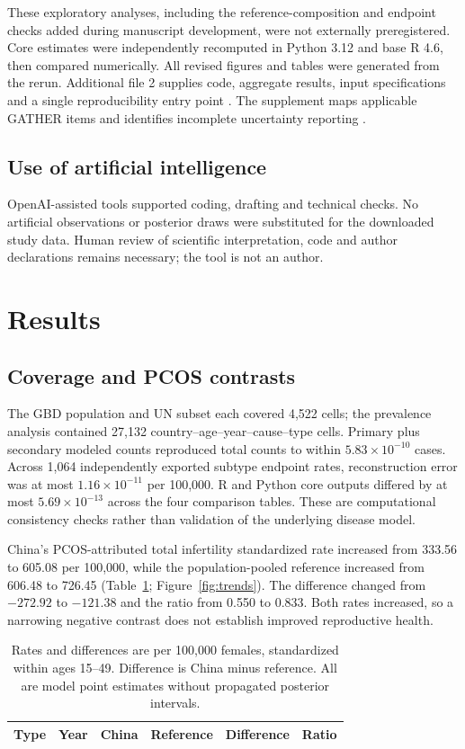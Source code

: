 \documentclass[11pt,a4paper]{article}
\begin{document}
These exploratory analyses, including the reference-composition and endpoint checks added during manuscript development, were not externally preregistered. Core estimates were independently recomputed in Python 3.12 and base R 4.6, then compared numerically. All revised figures and tables were generated from the rerun. Additional file 2 supplies code, aggregate results, input specifications and a single reproducibility entry point \cite{repository}. The supplement maps applicable GATHER items and identifies incomplete uncertainty reporting \cite{gather}.

\subsection{Use of artificial intelligence}
OpenAI-assisted tools supported coding, drafting and technical checks. No artificial observations or posterior draws were substituted for the downloaded study data. Human review of scientific interpretation, code and author declarations remains necessary; the tool is not an author.

\section{Results}
\subsection{Coverage and PCOS contrasts}
The GBD population and UN subset each covered 4,522 cells; the prevalence analysis contained 27,132 country--age--year--cause--type cells. Primary plus secondary modeled counts reproduced total counts to within $5.83\times10^{-10}$ cases. Across 1,064 independently exported subtype endpoint rates, reconstruction error was at most $1.16\times10^{-11}$ per 100,000. R and Python core outputs differed by at most $5.69\times10^{-13}$ across the four comparison tables. These are computational consistency checks rather than validation of the underlying disease model.

China's PCOS-attributed total infertility standardized rate increased from 333.56 to 605.08 per 100,000, while the population-pooled reference increased from 606.48 to 726.45 (Table~\ref{tab:pcos}; Figure~\ref{fig:trends}). The difference changed from $-272.92$ to $-121.38$ and the ratio from 0.550 to 0.833. Both rates increased, so a narrowing negative contrast does not establish improved reproductive health.

\begin{table}[htbp]\centering\small{}
\caption{PCOS-attributed infertility rates and contrasts under contemporary GBD population shares.}\label{tab:pcos}
\begin{tabular}{llrrrr}\toprule
Type & Year & China & Reference & Difference & Ratio\\\midrule
\end{tabular}
\caption*{Rates and differences are per 100,000 females, standardized within ages 15--49. Difference is China minus reference. All are model point estimates without propagated posterior intervals.}
\end{table}
\end{document}
